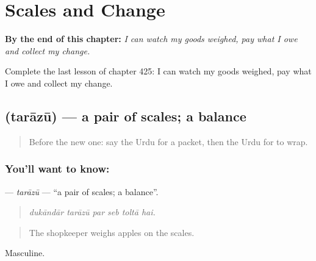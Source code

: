 
\chapter{Scales and Change}
\label{ch:ur-scales-and-change}

\begin{chapteropening}
\textbf{By the end of this chapter:} \emph{I can watch my goods weighed, pay what I owe and collect my change.}

Complete the last lesson of chapter 425: I can watch my goods weighed, pay what I owe and collect my change.
\end{chapteropening}

\section[\texorpdfstring{\ur{ترازو} (tarāzū)}{ترازو (tarāzū)}]{ (tarāzū) — a pair of scales; a balance}

\label{lesson:UR-C425-tarazu}



\begin{quote}
Before the new one: say the Urdu for a packet, then the Urdu for to wrap.
\end{quote}

\subsection*{You'll want to know: }
\textbf{} — \emph{tarāzū} — \textquotedblleft{}a pair of scales; a balance\textquotedblright{}.

\begin{quote}
     
\end{quote}

\begin{quote}
\emph{dukāndār tarāzū par seb toltā hai.}
\end{quote}

\begin{quote}
The shopkeeper weighs apples on the scales.
\end{quote}

Masculine.

